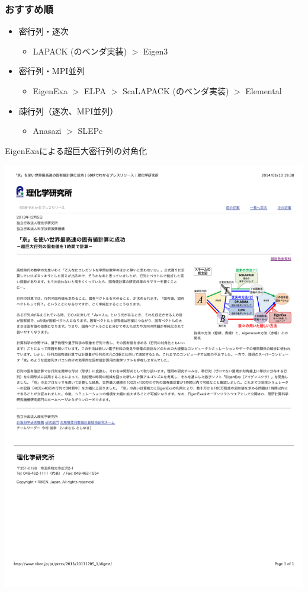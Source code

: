 \begin{frame}
  \frametitle{おすすめ順}
  \begin{itemize}
  \item 密行列・逐次
    \begin{itemize}
      \item LAPACK (のベンダ実装) $>$ Eigen3
    \end{itemize}
  \item 密行列・MPI並列
    \begin{itemize}
      \item EigenExa $>$ ELPA $>$ ScaLAPACK (のベンダ実装) $>$ Elemental
    \end{itemize}
  \item 疎行列（逐次、MPI並列）
    \begin{itemize}
      \item Anasazi $>$ SLEPc
    \end{itemize}
  \end{itemize}
\end{frame}

\begin{frame}{EigenExaによる超巨大密行列の対角化}
  \begin{center}
    \includegraphics[height=0.8\textheight]{figure/eigenexa.pdf}
  \end{center}
\end{frame}

